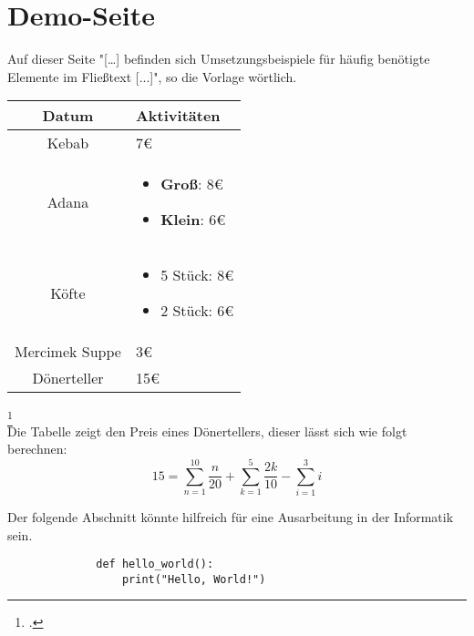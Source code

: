 \section{Demo-Seite}
Auf dieser Seite "[\ldots] befinden sich Umsetzungsbeispiele für häufig benötigte Elemente im Fließtext [...]", so die Vorlage w\"ortlich. \\

\begin{center}
    \begin{table}[h]
    \centering
    \begin{tabular}{|c|p{6cm}|}
        \hline
        \textbf{Datum} & \textbf{Aktivitäten} \\
        \hline
        Kebab & 7€ \\
        \hline
        Adana & \begin{itemize}
            \item \textbf{Groß}: 8€
            \item \textbf{Klein}: 6€
        \end{itemize} \\
        \hline
        Köfte & \begin{itemize}
            \item 5 Stück: 8€
            \item 2 Stück: 6€
        \end{itemize}\\
        \hline
        Mercimek Suppe & 3€ \\
        \hline
        Dönerteller & 15€ \\
        \hline
    \end{tabular}
    \label{tab:example}
    \end{table}
\end{center}
\footcitetext[Vgl.][]{DemoQuelle}\\ [-4em]

Die Tabelle zeigt den Preis eines Dönertellers, dieser lässt sich wie folgt berechnen:
\begin{equation}
    15 = \sum_{n=1}^{10} \frac{n}{20} + \sum_{k=1}^{5} \frac{2k}{10} - \sum_{i=1}^{3} i
\end{equation}

\newpage
Der folgende Abschnitt könnte hilfreich für eine Ausarbeitung in der Informatik sein.
\begin{figure}[h]
    \begin{lstlisting}
        def hello_world():
            print("Hello, World!")
    \end{lstlisting}
    \label{fig:meincode}
\end{figure}

